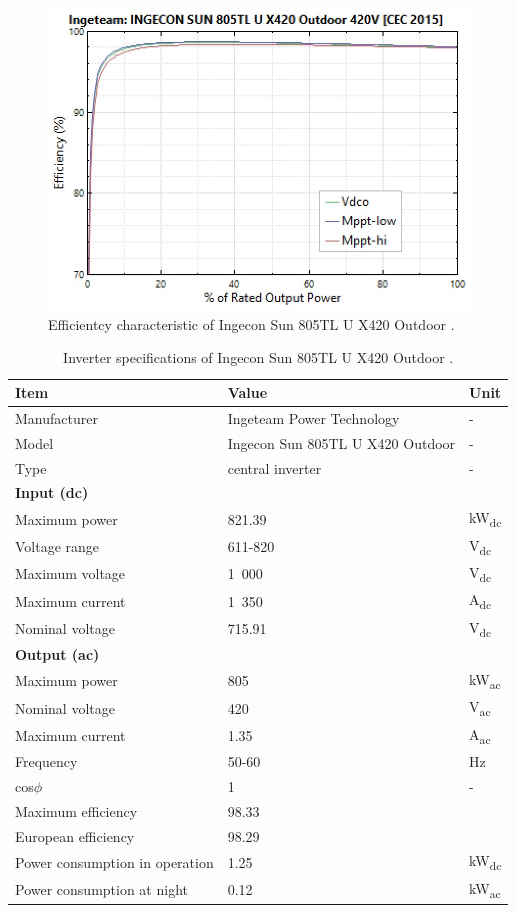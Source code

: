 \begin{figure}[htbp]  
\centering
\includegraphics[width=0.75\linewidth]{FIG/InverterEfficiencyCurve}
\caption[Efficientcy characteristic of Ingecon Sun 805TL U X420 Outdoor.]{Efficientcy characteristic of Ingecon Sun 805TL U X420 Outdoor \cite{IngeteamINC.2015,NREL2015g}.}\label{InverterEfficiencyCurve}
\end{figure}
\begin{table}[htbp]  
  \centering
	\begin{tabular}{ p{6.0cm}  C{7.0cm}  C{1.5cm} } 
	\hline	
\textbf{Item} & \textbf{Value} & \textbf{Unit} \\ \hline \hline
Manufacturer  & Ingeteam Power Technology & - \\ 
Model & Ingecon Sun 805TL U X420 Outdoor & - \\ 
Type &  central inverter & - \\ \hline
\textbf{Input (dc)} &  &  \\ 
Maximum power & 821.39 & kW\textsubscript{dc} \\ 
Voltage range & 611-820 & V\textsubscript{dc} \\ 
Maximum voltage & 1~000 & V\textsubscript{dc} \\ 
Maximum current & 1~350 & A\textsubscript{dc} \\
Nominal voltage & 715.91 & V\textsubscript{dc} \\ \hline
\textbf{Output (ac)} &  &  \\ 
Maximum power & 805 & kW\textsubscript{ac} \\ 
Nominal voltage & 420 & V\textsubscript{ac} \\
Maximum current & 1.35 & A\textsubscript{ac} \\
Frequency & 50-60 & Hz \\
cos$\phi$ & 1 & -\\ \hline
Maximum efficiency & 98.33 & \\%
European efficiency & 98.29 & \\%
Power consumption in operation &1.25 & kW\textsubscript{dc} \\ 
Power consumption at night & 0.12 & kW\textsubscript{ac} \\ 
\hline
\end{tabular}
\caption[Inverter specifications of Ingecon Sun 805TL U X420 Outdoor.]{Inverter specifications of Ingecon Sun 805TL U X420 Outdoor \cite{IngeteamINC.2015,NREL2015g}.}\label{tbl: PVinverter}
\end{table}
